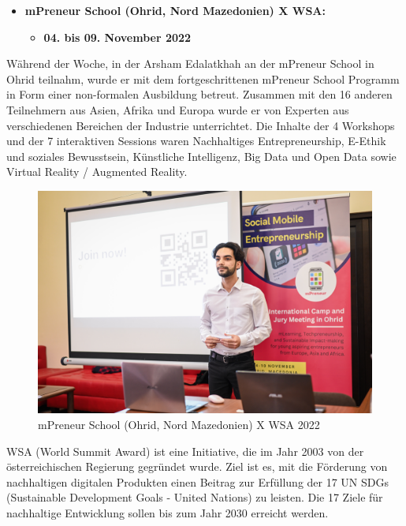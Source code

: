 \begin{itemize}
    \item \textbf{mPreneur School (Ohrid, Nord Mazedonien) X WSA:}
          \begin{itemize}
              \item \textbf{04. bis 09. November 2022}
          \end{itemize}
\end{itemize}

Während der Woche, in der Arsham Edalatkhah an der mPreneur School in Ohrid teilnahm, wurde er mit dem fortgeschrittenen mPreneur School Programm in Form einer non-formalen Ausbildung betreut. Zusammen mit den 16 anderen Teilnehmern aus Asien, Afrika und Europa wurde er von Experten aus verschiedenen Bereichen der Industrie unterrichtet. Die Inhalte der 4 Workshops und der 7 interaktiven Sessions waren Nachhaltiges Entrepreneurship, E-Ethik und soziales Bewusstsein, Künstliche Intelligenz, Big Data und Open Data sowie Virtual Reality / Augmented Reality.

\begin{figure}[H]
    \centering
    \includegraphics[width=1\textwidth]{pics/mPreneur-2022.JPG}
    \caption{mPreneur School (Ohrid, Nord Mazedonien) X WSA 2022}
    \label{fig:jugendHackt}
\end{figure}

WSA (World Summit Award) ist eine Initiative, die im Jahr 2003 von der österreichischen Regierung gegründet wurde. Ziel ist es, mit die Förderung von nachhaltigen digitalen Produkten einen Beitrag zur Erfüllung der 17 UN SDGs (Sustainable Development Goals - United Nations) zu leisten. Die 17 Ziele für nachhaltige Entwicklung sollen bis zum Jahr 2030 erreicht werden.

